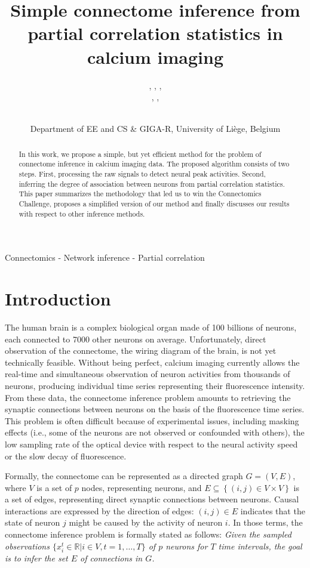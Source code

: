 \documentclass[wcp]{jmlr}
\title{Simple connectome inference from partial correlation statistics in calcium imaging}
\author{\Name{Antonio Sutera},
   \Name{Arnaud Joly},
   \Name{Vincent François-Lavet}, \Email{a.sutera@ulg.ac.be}\\
   \Name{Zixiao Aaron Qiu},
   \Name{Gilles Louppe},
   \Name{Damien Ernst}\and\Name{Pierre Geurts}
    \\
   \addr Department of EE and CS \& GIGA-R, University of Li\`ege, Belgium}
\begin{document}
\maketitle

\begin{abstract}
In this work, we propose a simple, but yet efficient method for the problem of
connectome inference in calcium imaging data. The proposed algorithm consists of
two steps. First, processing the raw signals to detect neural peak activities.
Second, inferring the degree of association between neurons from partial
correlation statistics. This paper summarizes the methodology that led us to
win the Connectomics Challenge, proposes a simplified version of our method and
finally discusses our results with respect to other inference methods.
\end{abstract}

\begin{keywords}
Connectomics - Network inference - Partial correlation
\end{keywords}


\section{Introduction}\label{sec:intro}

The human brain is a complex biological
organ made of 100 billions of neurons, each connected to 7000 other neurons on
average. Unfortunately, direct observation of the connectome, the wiring
diagram of the brain, is not yet technically feasible. Without being perfect,
calcium imaging currently allows the real-time and simultaneous observation of
neuron activities from thousands of neurons, producing individual time series
representing their fluorescence intensity. From these data, the connectome
inference problem amounts to retrieving the synaptic connections between
neurons on the basis of the fluorescence time series. This
problem is often difficult because of experimental issues, including
masking effects (i.e., some of the neurons are not observed or confounded with others), the low sampling rate of the optical device with respect to the
neural activity speed or the slow decay of fluorescence.

Formally, the connectome can be represented as a directed graph $G=(V,E)$,
where $V$ is a set of $p$ nodes, representing neurons, and $E \subseteq
\left\{(i, j) \in V \times V\right\}$ is a set of edges, representing direct
synaptic connections between neurons. Causal interactions are expressed by the
direction of edges: $(i, j) \in E$ indicates that the state of neuron $j$ might
be caused by the activity of neuron $i$. In those terms,  the connectome
inference problem is formally stated as follows:  \textit{Given the sampled
observations $\{ x^t_i \in \mathbb{R} | i \in V, t = 1, \dots, T \}$ of $p$
neurons for $T$ time intervals, the goal is to infer the set $E$ of connections
in $G$.}
\end{document}
